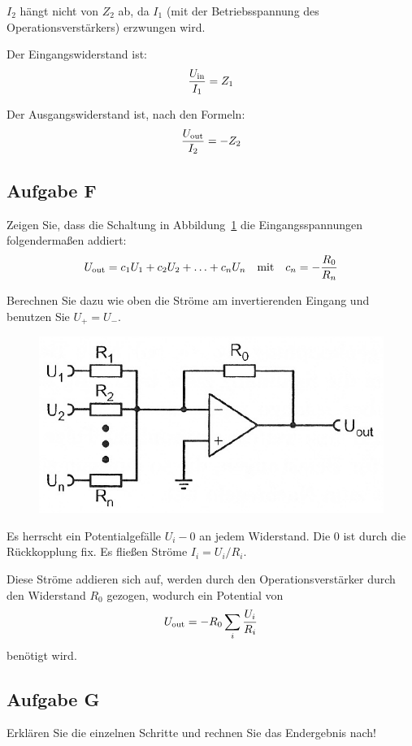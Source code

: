 $I_2$ hängt nicht von $Z_2$ ab, da $I_1$ (mit der Betriebsspannung des
Operationsverstärkers) erzwungen wird. 

Der Eingangswiderstand ist:
\[
	\frac{U_\text{in}}{I_1} = Z_1
\]

Der Ausgangswiderstand ist, nach den Formeln:
\[
	\frac{U_\text{out}}{I_2} = - Z_2
\]

\subsection{Aufgabe F}
\label{ssec:Aufgabe_F}

\begin{problem}
	Zeigen Sie, dass die Schaltung in Abbildung~\ref{fig:5_6-6} die
	Eingangsspannungen folgendermaßen addiert:
	\[
		U_\text{out} = c_1 U_1 + c_2 U_2 + \ldots + c_n U_n
		\quad \text{mit} \quad
		c_n = - \frac{R_0}{R_n}
	\]

	Berechnen Sie dazu wie oben die Ströme am invertierenden Eingang und
	benutzen Sie $U_+ = U_-$.
\end{problem}

\begin{figure}[htbp]
	\centering
	\includegraphics[width=.6\linewidth]{Anleitung/5_6-6.png}
	\caption{%
		\cite[Abbildung~5/6.6]{physik313-Anleitung}
	}
	\label{fig:5_6-6}
\end{figure}

Es herrscht ein Potentialgefälle $U_i - 0$ an jedem Widerstand. Die 0 ist
durch die Rückkopplung fix. Es fließen Ströme $I_i = U_i / R_i$.

Diese Ströme addieren sich auf, werden durch den Operationsverstärker durch den
Widerstand $R_0$ gezogen, wodurch ein Potential von
\[
	U_\text{out} = - R_0 \sum_i \frac{U_i}{R_i}
\]
benötigt wird.

\subsection{Aufgabe G}
\label{ssec:Aufgabe_G}

\begin{problem}
	Erklären Sie die einzelnen Schritte und rechnen Sie das Endergebnis nach!
\end{problem}

